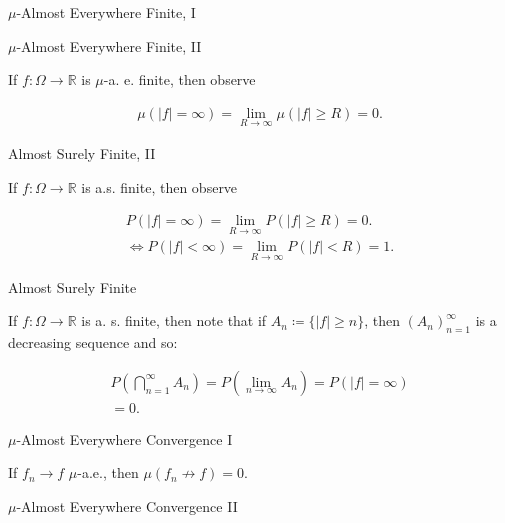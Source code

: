 \documentclass[10pt,landscape]{article}
\renewcommand{\geq}{\geqslant}
\begin{document}
\begin{multicols}{3}
\begin{observation}{}{$\mu$-Almost Everywhere Finite, I}
\end{observation}

\begin{observation}{}{$\mu$-Almost Everywhere Finite, II}

    If $f: \Omega \to \mathbb{R}$ is $\mu$-a. e. finite, then observe

        \begin{align*}
            \mu(|f| = \infty) = \lim_{R \to \infty} \mu(|f| \geq R) = 0.
        \end{align*}

\end{observation}

\begin{observation}{}{Almost Surely Finite, II}

    If $f: \Omega \to \mathbb{R}$ is a.s. finite, then observe

        \begin{align*}
            P(|f| = \infty) = \lim_{R \to \infty} P(|f| \geq R) = 0. \\
            \iff P(|f| < \infty) = \lim_{R \to \infty} P(|f| < R) = 1.
        \end{align*}

\end{observation}

\begin{observation}{}{Almost Surely Finite}

    If $f: \Omega \to \mathbb{R}$ is a. s. finite, then note that if $A_n \coloneqq \{ |f| \geq n \}$, then $(A_n)_{n=1}^{\infty}$ is a decreasing sequence and so:

        \begin{align*}
            P\left(\bigcap_{n=1}^{\infty} A_n\right) = P\left(\lim_{n \to \infty} A_n\right) = P(|f| = \infty) \\ = 0.
        \end{align*}

\end{observation}

\begin{observation}{}{$\mu$-Almost Everywhere Convergence I}

    If $f_n \to f$ $\mu$-a.e., then $\mu(f_n \not\to f) = 0$.

\end{observation}

\begin{observation}{}{$\mu$-Almost Everywhere Convergence II}


\end{observation}
\end{multicols}
\end{document}
